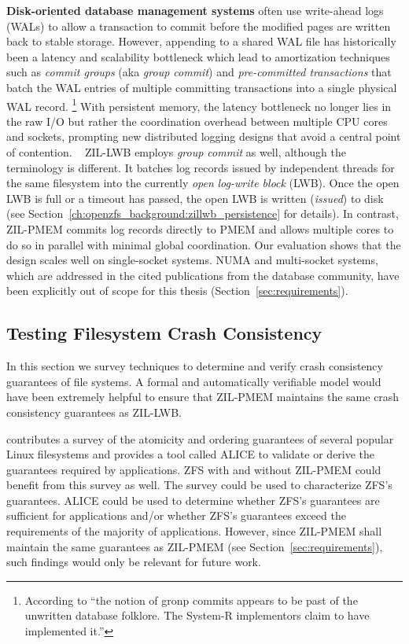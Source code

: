\documentclass[12pt,a4paper,twoside]{book}
\begin{document}
\textbf{Disk-oriented database management systems} often use write-ahead logs (WALs) to allow a transaction to commit before the modified pages are written back to stable storage.
However, appending to a shared WAL file has historically been a latency and scalability bottleneck which lead to amortization techniques such as \textit{commit groups} (aka \textit{group commit}) and \textit{pre-committed transactions} that batch the WAL entries of multiple committing transactions into a single physical WAL record.%
\footnote{According to \cite{dewittImplementationTechniquesMain1984} ``the notion of gronp commits appears to be past of the unwritten database folklore. The System-R implementors claim to have implemented it.''}
With persistent memory, the latency bottleneck no longer lies in the raw I/O but rather the coordination overhead between multiple CPU cores and sockets, prompting new distributed logging designs that avoid a central point of contention.%
~\cite{fangHighPerformanceDatabase2011,pelleyStorageManagementNVRAM2013,johnsonAetherScalableApproach2010}
ZIL-LWB employs \textit{group commit} as well, although the terminology is different.
It batches log records issued by independent threads for the same filesystem into the currently \textit{open} \textit{log-write block} (LWB).
Once the open LWB is full or a timeout has passed, the open LWB is written (\textit{issued}) to disk (see Section~\ref{ch:openzfs_background:zillwb_persistence} for details).
In contrast, ZIL-PMEM commits log records directly to PMEM and allows multiple cores to do so in parallel with minimal global coordination.
Our evaluation shows that the design scales well on single-socket systems.
NUMA and multi-socket systems, which are addressed in the cited publications from the database community, have been explicitly out of scope for this thesis (Section~\ref{sec:requirements}).

\subsection{Testing Filesystem Crash Consistency}
In this section we survey techniques to determine and verify crash consistency guarantees of file systems.
A formal and automatically verifiable model would have been extremely helpful to ensure that ZIL-PMEM maintains the same crash consistency guarantees as ZIL-LWB.

 contributes a survey of the atomicity and ordering guarantees of several popular Linux filesystems and provides a tool called ALICE to validate or derive the guarantees required by applications.
ZFS with and without ZIL-PMEM could benefit from this survey as well.
The survey could be used to characterize ZFS’s guarantees.
ALICE could be used to determine whether ZFS’s guarantees are sufficient for applications and/or whether ZFS’s guarantees exceed the requirements of the majority of applications.
However, since ZIL-PMEM shall maintain the same guarantees as ZIL-PMEM (see Section~\ref{sec:requirements}), such findings would only be relevant for future work.
\end{document}
